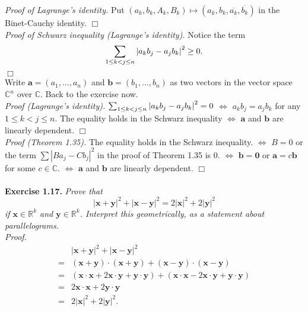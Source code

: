 \documentclass{article}
\begin{document}
\emph{Proof of Lagrange's identity.}
Put $(a_k, b_k, A_k, B_k) \mapsto (a_k, b_k, \overline{a_k}, \overline{b_k})$
in the Binet-Cauchy identity.
$\Box$ \\

\emph{Proof of Schwarz inequality (Lagrange's identity).}
Notice the term $$\sum_{1 \leq k < j \leq n} \abs{ a_k b_j - a_j b_k }^2 \geq 0.$$
$\Box$ \\

Write $\mathbf{a} = (a_1, \ldots, a_n)$ and $\mathbf{b} = (b_1, \ldots, b_n)$
as two vectors in the vector space $\mathbb{C}^n$ over $\mathbb{C}$.
Back to the exercise now. \\

\emph{Proof (Lagrange's identity).}
$\sum_{1 \leq k < j \leq n} \abs{ a_k b_j - a_j b_k }^2 = 0$
$\Longleftrightarrow$
$a_k b_j = a_j b_k$ for any $1 \leq k < j \leq n$.
The equality holds in the Schwarz inequality
$\Longleftrightarrow$
$\mathbf{a}$ and $\mathbf{b}$ are linearly dependent.
$\Box$ \\

\emph{Proof (Theorem 1.35).}
The equality holds in the Schwarz inequality.
$\Longleftrightarrow$
$B = 0$ or
the term $\sum |B a_j - C b_j|^2$ in the proof of Theorem 1.35 is $0$.
$\Longleftrightarrow$
$\mathbf{b} = \mathbf{0}$ or $\mathbf{a} = c\mathbf{b}$ for some $c \in \mathbb{C}$.
$\Longleftrightarrow$
$\mathbf{a}$ and $\mathbf{b}$ are linearly dependent.
$\Box$ \\\\






\textbf{Exercise 1.17.}
\emph{Prove that
$$|\mathbf{x}+\mathbf{y}|^2 + |\mathbf{x}-\mathbf{y}|^2
= 2|\mathbf{x}|^2 + 2|\mathbf{y}|^2$$
if $\mathbf{x} \in \mathbb{R}^k$ and $\mathbf{y} \in \mathbb{R}^k$.
Interpret this geometrically,
as a statement about parallelograms.} \\

\emph{Proof.}
\begin{align*}
&|\mathbf{x}+\mathbf{y}|^2 + |\mathbf{x}-\mathbf{y}|^2 \\
=& (\mathbf{x}+\mathbf{y})\cdot(\mathbf{x}+\mathbf{y})
  + (\mathbf{x}-\mathbf{y})\cdot(\mathbf{x}-\mathbf{y}) \\
=& (\mathbf{x}\cdot\mathbf{x} + 2\mathbf{x}\cdot\mathbf{y} + \mathbf{y}\cdot\mathbf{y})
  + (\mathbf{x}\cdot\mathbf{x} - 2\mathbf{x}\cdot\mathbf{y} + \mathbf{y}\cdot\mathbf{y}) \\
=& 2\mathbf{x}\cdot\mathbf{x} + 2\mathbf{y}\cdot\mathbf{y} \\
=& 2|\mathbf{x}|^2 + 2|\mathbf{y}|^2.
\end{align*}
\end{document}
